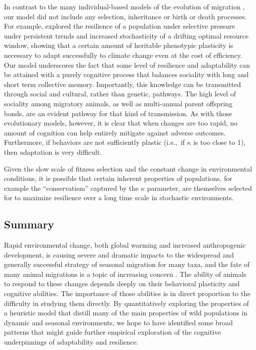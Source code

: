 \documentclass[utf8]{frontiersSCNS} %
\begin{document}
	In contrast to the many individual-based models of the evolution of migration \citep[e.g.][]{Guttal2010, Shaw2013, Anderson2013}, our model did not include any selection, inheritance or birth or death processes. For example, \citet{Anderson2013} explored the resilience of a population under selective pressure under persistent trends and increased stochasticity of a drifting optimal resource window, showing that a certain amount of heritable phenotypic plasticity is necessary to adapt successfully to climate change even at the cost of efficiency. Our model underscores the fact that some level of resilience and adaptability can be attained with a purely cognitive process that balances sociality with long and short term collective memory. Importantly, this knowledge can be transmitted through social and cultural, rather than genetic, pathways. The high level of sociality among migratory animals, as well as multi-annual parent offspring bonds, are an evident pathway for that kind of transmission.  As with those evolutionary models, however, it is clear that when changes are too rapid, no amount of cognition can help entirely mitigate against adverse outcomes. Furthermore, if behaviors are not sufficiently plastic (i.e.,~if $\kappa$ is too close to 1), then adaptation is very difficult.  
	
	Given the slow scale of fitness selection and the constant change in environmental conditions, it is possible that certain inherent properties of populations, for example the ``conservatism'' captured by the $\kappa$ parameter, are themselves selected for to maximize resilience over a long time scale in stochastic environments. 
	
	
\subsection{Summary}
	
	Rapid environmental change, both global warming and increased anthropogenic development, is causing severe and dramatic impacts to the widespread and generally successful strategy of seasonal migration for many taxa, and the fate of many animal migrations is a topic of increasing concern \citep{Wilcove2008, Kauffman2021}. The ability of animals to respond to these changes depends deeply on their behavioral plasticity and cognitive abilities. The importance of those abilities is in direct proportion to the difficulty in studying them directly.	By quantitatively exploring the properties of a heuristic model that distill many of the main properties of wild populations in dynamic and seasonal environments, we hope to have identified some broad patterns that might guide further empirical exploration of the cognitive underpinnings of adaptability and resilience.	
\end{document}
